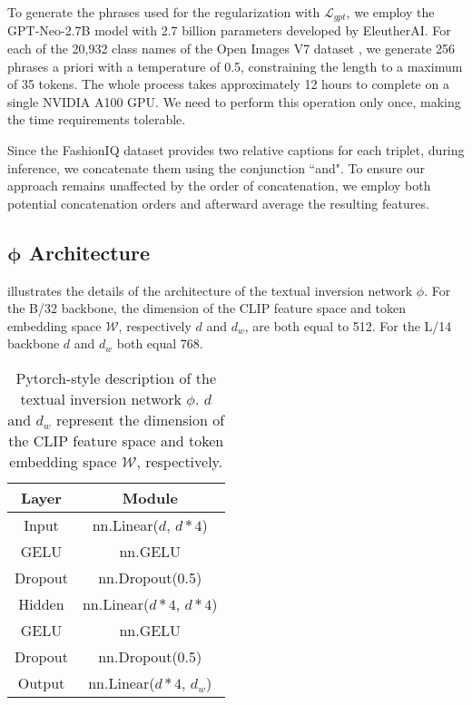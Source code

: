 \documentclass[10pt,twocolumn,letterpaper]{article}
\DeclareRobustCommand{\vect}[1]{\bm{#1}}
\begin{document}
To generate the phrases used for the regularization with $\mathcal{L}_{gpt}$, we employ the GPT-Neo-2.7B model with 2.7 billion parameters developed by EleutherAI. For each of the 20,932 class names of the Open Images V7 dataset \cite{kuznetsova2020open}, we generate 256 phrases a priori with a temperature of 0.5, constraining the length to a maximum of 35 tokens. The whole process takes approximately 12 hours to complete on a single NVIDIA A100 GPU. We need to perform this operation only once, making the time requirements tolerable.

Since the FashionIQ dataset provides two relative captions for each triplet, during inference, we concatenate them using the conjunction ``and". To ensure our approach remains unaffected by the order of concatenation, we employ both potential concatenation orders and afterward average the resulting features.

\subsection{$\vect{\phi}$ Architecture}
 illustrates the details of the architecture of the textual inversion network $\phi$. For the B/32 backbone, the dimension of the CLIP feature space and token embedding space $\mathcal{W}$, respectively $d$ and $d_w$, are both equal to 512. For the L/14 backbone $d$ and $d_w$ both equal 768. 

\begin{table}
    \centering
    \begin{tabular}{cc}
        Layer & Module \\ \midrule
        Input & nn.Linear($d$, $d*4$) \\
        GELU & nn.GELU \\
        Dropout & nn.Dropout(0.5) \\
        Hidden & nn.Linear($d*4$, $d*4$) \\
        GELU & nn.GELU \\
        Dropout & nn.Dropout(0.5) \\
        Output & nn.Linear($d*4$, $d_w$) \\ \bottomrule
    \end{tabular}
    \caption{Pytorch-style description of the textual inversion network $\phi$. $d$ and $d_w$ represent the dimension of the CLIP feature space and token embedding space $\mathcal{W}$, respectively.}
    \vspace{-3ex}
    \label{tab:phi_architecture}
\end{table}
\end{document}
